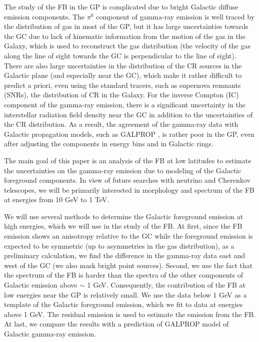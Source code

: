 The study of the FB in the GP is complicated due to bright Galactic diffuse emission components.
The $\pi^0$ component of gamma-ray emission is well traced by the distribution of gas in most of the GP,
but it has large uncertainties towards the GC due to lack of kinematic information from the motion of the gas in the 
Galaxy, which is used to reconstruct the gas distribution
(the velocity of the gas along the line of sight towards the GC is perpendicular to the line of sight).
There are also large uncertainties in the distribution of the CR sources in the Galactic plane (and especially near the GC),
which make it rather difficult to predict a priori, even using the standard tracers, such as supernova remnants (SNRs), the distribution
of CR in the Galaxy.
For the inverse Compton (IC) component of the gamma-ray emission, 
there is a significant uncertainty in the interstellar radiation field density near the GC \citep[e.g.,][]{2017ApJ...846...67P} in addition to 
the uncertainties of the CR distribution.
As a result, the agreement of the gamma-ray data with Galactic propagation models, such as GALPROP \citep{2007ARNPS..57..285S}, 
is rather poor in the GP, even after adjusting the components in energy bins and in Galactic rings.

The main goal of this paper is an analysis of the FB at low latitudes to estimate the uncertainties on the gamma-ray 
emission due to modeling of the Galactic foreground components.
In view of future searches with neutrino and Cherenkov telescopes, 
we will be primarily interested in morphology and spectrum of the FB at energies from 10 GeV to 1 TeV.

We will use several methods to determine the Galactic foreground emission at high energies,
which we will use in the study of the FB.
At first, since the FB emission shows an anisotropy relative to the GC
while the foreground emission is expected to be symmetric (up to asymmetries in the gas distribution),
as a preliminary calculation, we find the difference in the gamma-ray data east and west of the GC 
(we also mask bright point sources).
Second, we use the fact that the spectrum of the FB is harder than the spectra of the other components of Galactic emission
above $\sim$ 1 GeV.
Consequently, the contribution of the FB at low energies near the GP is relatively small. 
We use the data below 1 GeV as a template of the Galactic foreground emission, 
which we fit to data at energies above 1 GeV.
The residual emission is used to estimate the emission from the FB.
At last, we compare the results with a prediction of GALPROP model of Galactic gamma-ray emission.





